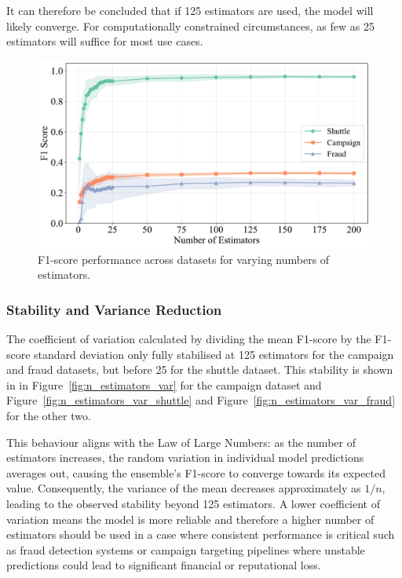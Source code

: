 \documentclass[10pt, conference]{IEEEtran}
\begin{document}
It can therefore be concluded that if 125 estimators are used, the model will likely converge. For computationally constrained circumstances, as few as 25 estimators will suffice for most use cases.
\begin{figure}[H]
	\centering
	\includegraphics[width=0.95\linewidth]{../results/multi_dataset/n_estimators_f1.pdf}
	\caption{F1-score performance across datasets for varying numbers of estimators.}
	\label{fig:n_estimators_f1}
\end{figure}





\subsubsection{Stability and Variance Reduction}
The coefficient of variation calculated by dividing the mean F1-score by the F1-score standard deviation only fully stabilised at 125 estimators for the campaign and fraud datasets, but before 25 for the shuttle dataset. This stability is shown in in Figure~\ref{fig:n_estimators_var} for the campaign dataset and Figure~\ref{fig:n_estimators_var_shuttle} and Figure~\ref{fig:n_estimators_var_fraud} for the other two. 

This behaviour aligns with the Law of Large Numbers: as the number of estimators increases, the random variation in individual model predictions averages out, causing the ensemble’s F1-score to converge towards its expected value. Consequently, the variance of the mean decreases approximately as 
$1/n$, leading to the observed stability beyond 125 estimators. A lower coefficient of variation means the model is more reliable and therefore a higher number of estimators should be used in a case where consistent performance is critical such as fraud detection systems or campaign targeting pipelines where unstable predictions could lead to significant financial or reputational loss.
\end{document}
